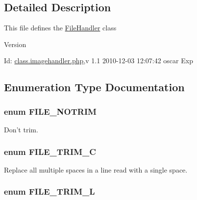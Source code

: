 \subsection{Detailed Description}
This file defines the \hyperlink{classFileHandler}{FileHandler} class \begin{DoxyVersion}{Version}

\end{DoxyVersion}
\begin{DoxyParagraph}{Id:}
\hyperlink{class_8imagehandler_8php}{class.imagehandler.php},v 1.1 2010-\/12-\/03 12:07:42 oscar Exp 
\end{DoxyParagraph}


\subsection{Enumeration Type Documentation}
\subsubsection[{FILE\_\-NOTRIM}]{\setlength{\rightskip}{0pt plus 5cm}enum {\bf FILE\_\-NOTRIM}}\label{class_8imagehandler_8php_a3720f2e15eb9e16e29d8ecbb96763662}


Don't trim. 

\subsubsection[{FILE\_\-TRIM\_\-C}]{\setlength{\rightskip}{0pt plus 5cm}enum {\bf FILE\_\-TRIM\_\-C}}\label{class_8imagehandler_8php_a2787c3a1ecef8697c863800d0b2848a4}


Replace all multiple spaces in a line read with a single space. 

\subsubsection[{FILE\_\-TRIM\_\-L}]{\setlength{\rightskip}{0pt plus 5cm}enum {\bf FILE\_\-TRIM\_\-L}}\label{class_8imagehandler_8php_a080de95fd7cf2e8d8ac78ac7ad9471ee}


